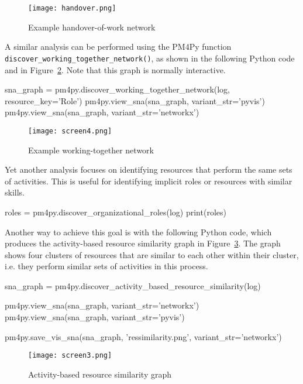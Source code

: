 \begin{figure}
\centering
\texttt{[image: handover.png]}
\caption{Example handover-of-work network}
\label{fig:handover}
\end{figure}

A similar analysis can be performed using the PM4Py function \\ \texttt{discover\_working\_together\_network()}, as shown in the following Python code and in Figure~\ref{fig:workingtogether}. Note that this graph is normally interactive.

\begin{pythoncode}
sna_graph = pm4py.discover_working_together_network(log,
   resource_key='Role')
pm4py.view_sna(sna_graph, variant_str='pyvis')   
pm4py.view_sna(sna_graph, variant_str='networkx')   
\end{pythoncode}

\begin{figure}
\centering
\texttt{[image: screen4.png]}
\caption{Example working-together network}
\label{fig:workingtogether}
\end{figure}

Yet another analysis focuses on identifying resources that perform the same sets of activities. This is useful for identifying implicit roles or resources with similar skills.

\begin{pythoncode}
roles = pm4py.discover_organizational_roles(log)
print(roles)
\end{pythoncode}

Another way to achieve this goal is with the following Python code, which produces the activity-based resource similarity graph in Figure~\ref{fig:resource_similarity}. The graph shows four clusters of resources that are similar to each other within their cluster, i.e. they perform similar sets of activities in this process. 

\begin{pythoncode}
sna_graph = pm4py.discover_activity_based_resource_similarity(log)

pm4py.view_sna(sna_graph, variant_str='networkx')
pm4py.view_sna(sna_graph, variant_str='pyvis')

pm4py.save_vis_sna(sna_graph, 'ressimilarity.png',
    variant_str='networkx')
\end{pythoncode}

\begin{figure}
\centering
\texttt{[image: screen3.png]}
\caption{Activity-based resource similarity graph}
\label{fig:resource_similarity}
\end{figure}

